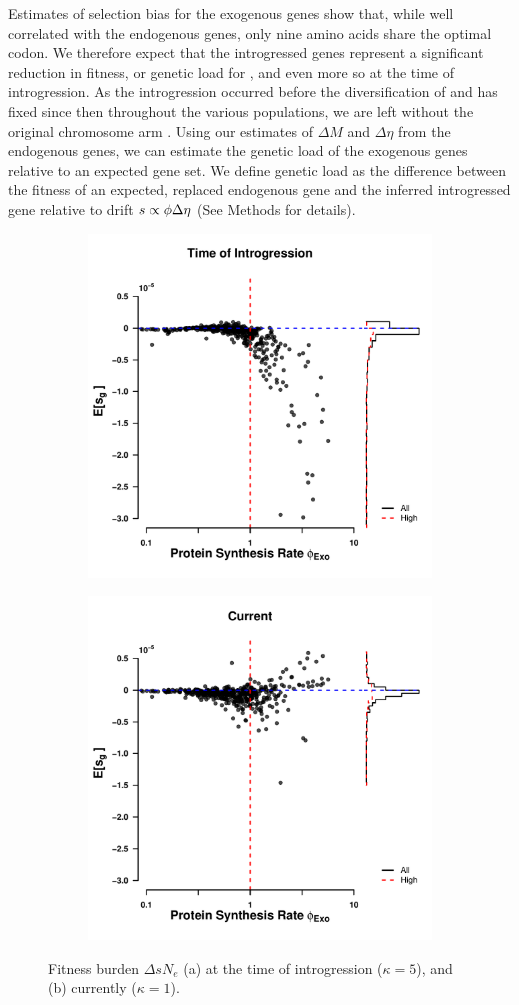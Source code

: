 \documentclass[12pt]{article}
\begin{document}
Estimates of selection bias for the exogenous genes show that, while well correlated with the endogenous genes, only nine amino acids share the optimal codon.
We therefore expect that the introgressed genes represent a significant reduction in fitness, or genetic load for \kluyveri, and even more so at the time of introgression.
As the introgression occurred before the diversification of \kluyveri and has fixed since then throughout the various populations, we are left without the original chromosome arm \citep{friedrich2015}.
Using our estimates of $\Delta M$ and $\Delta \eta$ from the endogenous genes, we can estimate the genetic load of the exogenous genes relative to an expected gene set.
We define genetic load as the difference between the fitness of an expected, replaced endogenous gene and the inferred introgressed gene relative to drift $s \propto \phi {\Delta \eta}$ (See Methods for details).
\begin{figure}[h]
    \centering
    \begin{subfigure}
        \centering
        \includegraphics[width=.45\textwidth]{img/fitness_difference_gos_kappa5.pdf}
    \end{subfigure}
    \begin{subfigure}
        \centering
        \includegraphics[width=.45\textwidth]{img/fitness_difference_exo.pdf}
    \end{subfigure}
    \caption{Fitness burden $\Delta sN_e$ (a) at the time of introgression ($\kappa = 5$), and (b) currently ($\kappa = 1$). }
    \label{fig:sne_fitness_burden}
\end{figure}
\end{document}
